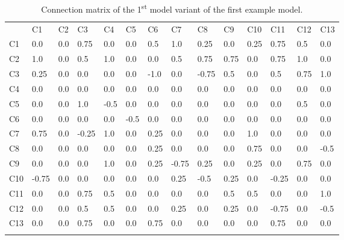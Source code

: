 \documentclass[graybox]{svmult}
\begin{document}
\begin{table}
\caption{Connection matrix of the 1\textsuperscript{st} model variant of the first example model.}
\label{tab:V1connectionMtx}
\begin{center}
\begin{tabular}{l|lllllllllllll}
\hline\noalign{\smallskip}
 &      C1 &    C2 &    C3 &    C4 &    C5 &    C6 &    C7 &    C8 &    C9 &    C10 &   C11 &   C12 &   C13\\
\noalign{\smallskip}\hline\noalign{\smallskip}
C1 &    0.0 &   0.0 &   0.75 &  0.0 &   0.0 &   0.5 &   1.0 &   0.25 &  0.0 &   0.25 &  0.75 &  0.5 &   0.0\\
C2 &    1.0 &   0.0 &   0.5 &   1.0 &   0.0 &   0.0 &   0.5 &   0.75 &  0.75 &  0.0 &   0.75 &  1.0 &   0.0\\
C3 &    0.25 &  0.0 &   0.0 &   0.0 &   0.0 &   -1.0 &  0.0 &   -0.75 & 0.5 &   0.0 &   0.5 &   0.75 &  1.0\\
C4 &    0.0 &   0.0 &   0.0 &   0.0 &   0.0 &   0.0 &   0.0 &   0.0 &   0.0 &   0.0 &   0.0 &   0.0 &   0.0\\
C5 &    0.0 &   0.0 &   1.0 &   -0.5 &  0.0 &   0.0 &   0.0 &   0.0 &   0.0 &   0.0 &   0.0 &   0.5 &   0.0\\
C6 &    0.0 &   0.0 &   0.0 &   0.0 &   -0.5 &  0.0 &   0.0 &   0.0 &   0.0 &   0.0 &   0.0 &   0.0 &   0.0\\
C7 &    0.75 &  0.0 &   -0.25 & 1.0 &   0.0 &   0.25 &  0.0 &   0.0 &   0.0 &   1.0 &   0.0 &   0.0 &   0.0\\
C8 &    0.0 &   0.0 &   0.0 &   0.0 &   0.0 &   0.25 &  0.0 &   0.0 &   0.0 &   0.75 &  0.0 &   0.0 &   -0.5\\
C9 &    0.0 &   0.0 &   0.0 &   1.0 &   0.0 &   0.25 &  -0.75 & 0.25 &  0.0 &   0.25 &  0.0 &   0.75 &  0.0\\
C10 &   -0.75 & 0.0 &   0.0 &   0.0 &   0.0 &   0.0 &   0.25 &  -0.5 &  0.25 &  0.0 &   -0.25 & 0.0 &   0.0\\
C11 &   0.0 &   0.0 &   0.75 &  0.5 &   0.0 &   0.0 &   0.0 &   0.0 &   0.5 &   0.5 &   0.0 &   0.0 &   1.0\\
C12 &   0.0 &   0.0 &   0.5 &   0.5 &   0.0 &   0.0 &   0.25 &  0.0 &   0.25 &  0.0 &   -0.75 & 0.0 &   -0.5\\
C13 &   0.0 &   0.0 &   0.75 &  0.0 &   0.0 &   0.75 &  0.0 &   0.0 &   0.0 &   0.0 &   0.75 &  0.0 &   0.0\\
\noalign{\smallskip}\hline
\end{tabular}
\end{center}
\end{table}
\end{document}
